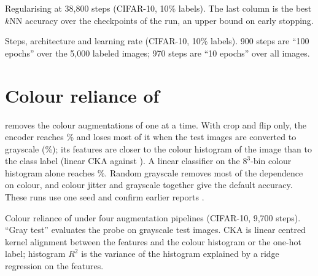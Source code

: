 \begin{table}[h]
\centering
\small
\caption{Regularising \supcon at 38,800 steps (CIFAR-10, 10\% labels). The last column is the best $k$NN
accuracy over the checkpoints of the run, an upper bound on early stopping.}
\label{tab:reg}
\begin{adjustbox}{max width=\linewidth}

\end{adjustbox}
\end{table}

\begin{table}[h]
\centering
\small
\caption{Steps, architecture and learning rate (CIFAR-10, 10\% labels). 900 steps are ``100 epochs'' over the
5,000 labeled images; 970 steps are ``10 epochs'' over all images.}
\label{tab:r50}

\end{table}

\section{Colour reliance of \simclr}
\label{app:colour}
 removes the colour augmentations of \simclr one at a time. With crop and flip only, the
encoder reaches \% and loses most of it when the test images are converted to
grayscale (\%); its features are closer to the colour histogram of the
image than to the class label (linear CKA  against
 \citep{kornblith2019cka}). A linear classifier on the $8^3$-bin colour
histogram alone reaches \%. Random grayscale removes most of the dependence on colour, and
colour jitter and grayscale together give the default accuracy. These runs use one seed and confirm earlier
reports \citep{chen2020simclr,chen2021intriguing,robinson2021can,geirhos2020shortcut}.

\begin{table}[h]
\centering
\small
\caption{Colour reliance of \simclr under four augmentation pipelines (CIFAR-10, 9,700 steps). ``Gray test''
evaluates the \lpall probe on grayscale test images. CKA is linear centred kernel alignment between the
features and the colour histogram or the one-hot label; histogram $R^2$ is the variance of the histogram
explained by a ridge regression on the features.}
\label{tab:colour}
\begin{adjustbox}{max width=\linewidth}

\end{adjustbox}
\end{table}

